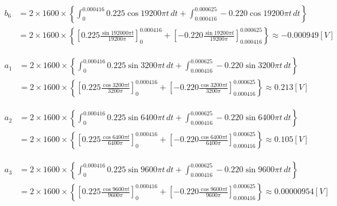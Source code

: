 \begin{screen}
  \begin{equation}
    \begin{aligned}
      b_6 &= 2\times1600\times\left\{ \int_{0}^{0.000416}0.225\cos 19200\pi t \,dt+ \int_{0.000416}^{0.000625}-0.220\cos 19200\pi t \,dt \right\}\\
      &= 2\times1600\times\left\{ \left[0.225\frac{\sin192000\pi t}{19200\pi}\right]^{0.000416}_0+ \left[-0.220\frac{\sin 19200\pi t}{19200\pi}\right]^{0.000625}_{0.000416} \right\} \approx -0.000949 \si{[V]} \label{eq14}
    \end{aligned}
  \end{equation}
\end{screen}

\begin{screen}
  \begin{equation}
    \begin{aligned}
      a_1 &= 2\times1600\times\left\{ \int_{0}^{0.000416}0.225\sin 3200\pi t \,dt+ \int_{0.000416}^{0.000625}-0.220\sin 3200\pi t \,dt \right\}\\
      &= 2\times1600\times\left\{ \left[0.225\frac{\cos3200\pi t}{3200\pi}\right]^{0.000416}_0+ \left[-0.220\frac{\cos 3200\pi t}{3200\pi}\right]^{0.000625}_{0.000416} \right\} \approx 0.213 \si{[V]} \label{eq15}
    \end{aligned}
  \end{equation}
\end{screen}

\begin{screen}
  \begin{equation}
    \begin{aligned}
      a_2 &= 2\times1600\times\left\{ \int_{0}^{0.000416}0.225\sin 6400\pi t \,dt+ \int_{0.000416}^{0.000625}-0.220\sin 6400\pi t \,dt \right\}\\
      &= 2\times1600\times\left\{ \left[0.225\frac{\cos6400\pi t}{6400\pi}\right]^{0.000416}_0+ \left[-0.220\frac{\cos 6400\pi t}{6400\pi}\right]^{0.000625}_{0.000416} \right\} \approx 0.105 \si{[V]} \label{eq16}
    \end{aligned}
  \end{equation}
\end{screen}

\begin{screen}
  \begin{equation}
    \begin{aligned}
      a_3 &= 2\times1600\times\left\{ \int_{0}^{0.000416}0.225\sin 9600\pi t \,dt+ \int_{0.000416}^{0.000625}-0.220\sin 9600\pi t \,dt \right\}\\
      &= 2\times1600\times\left\{ \left[0.225\frac{\cos9600\pi t}{9600\pi}\right]^{0.000416}_0+ \left[-0.220\frac{\cos 9600\pi t}{9600\pi}\right]^{0.000625}_{0.000416} \right\} \approx 0.00000954 \si{[V]} \label{eq17}
    \end{aligned}
  \end{equation}
\end{screen}

